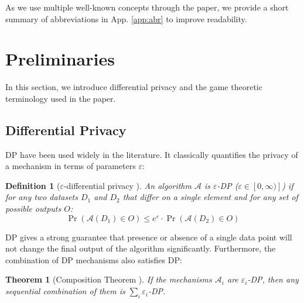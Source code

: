 \documentclass[USenglish,oneside,twocolumn]{article}
\theoremstyle{plain}
\newtheorem*{theorem*}{Theorem}
\newtheorem*{definition*}{Definition}
\begin{document}
    As we use multiple well-known concepts  through the paper, we provide a short summary of abbreviations in App. \ref{app:abr} to improve readability. 
	
    \vspace{-0.5cm}
    \section{Preliminaries}
    \label{sec:intro_game}
    \vspace{-0.25cm}
    
    In this section, we introduce differential privacy and the game theoretic terminology used in the paper.
    
    \vspace{-0.5cm}
    \subsection{Differential Privacy}
    \vspace{-0.25cm}
    
    DP \cite{dwork2006calibrating} have been used widely in the literature. It classically quantifies the privacy of a mechanism in terms of parameters $\varepsilon$:
    
    \vspace{-0.25cm}
    \begin{definition*}[$\varepsilon$-differential privacy \cite{dwork2006calibrating}]
        An algorithm $\mathcal{A}$ is $\varepsilon$-DP ($\varepsilon\in[0,\infty)]$) if for any two datasets $D_1$ and $D_2$ that differ on a single element and for any set of possible outputs $O$:
        \vspace{-0.25cm}
        \begin{equation*}
        \Pr(\mathcal{A}(D_1)\in O)\leq e^{\varepsilon}\cdot\Pr(\mathcal{A}(D_2)\in O)
        \end{equation*}
    \end{definition*}
    \vspace{-0.25cm}
    
    DP gives a strong guarantee that presence or absence of a single data point will not change the final output of the algorithm significantly. Furthermore, the combination of DP mechanisms also satisfies DP:
    
    \vspace{-0.25cm}
    \begin{theorem*}[Composition Theorem \cite{dwork2006calibrating}]
        If the mechanisms $\mathcal{A}_i$ are $\varepsilon_i$-DP, then any sequential combination of them is $\sum_i\varepsilon_i$-DP.
    \end{theorem*}
    \vspace{-0.25cm}
    
\end{document}
